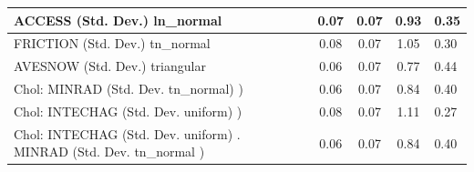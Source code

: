 \begin{table}
\begin{center}
\begin{tabular}{|l|l|c|c|c|l|}
			\hline
			ACCESS (Std. Dev.) ln_normal &  & 0.07 & 0.07 & 0.93 & 0.35 \\
			\hline
			FRICTION (Std. Dev.) tn_normal &  & 0.08 & 0.07 & 1.05 & 0.30 \\
			\hline
			AVESNOW (Std. Dev.) triangular &  & 0.06 & 0.07 & 0.77 & 0.44 \\
			\hline
			 Chol: MINRAD (Std. Dev. tn_normal) ) &  & 0.06 & 0.07 & 0.84 & 0.40 \\
			\hline
			 Chol: INTECHAG (Std. Dev. uniform) ) &  & 0.08 & 0.07 & 1.11 & 0.27 \\
			\hline
			 Chol: INTECHAG (Std. Dev. uniform) . MINRAD (Std. Dev.   tn_normal ) &  & 0.06 & 0.07 & 0.84 & 0.40 \\
			\hline
		\end{tabular}
	\end{center}
\end{table}